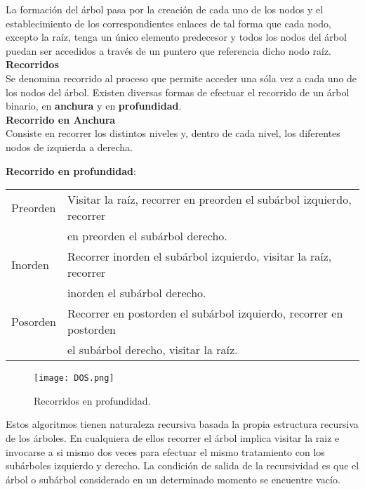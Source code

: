 \documentclass[12pt]{article}
\begin{document}
La formación del árbol pasa por la creación de cada uno de los nodos y el establecimiento de los correspondientes enlaces de tal forma que cada nodo, excepto la raíz, tenga un único elemento predecesor y todos los nodos del árbol puedan ser accedidos a través de un puntero que referencia dicho nodo raíz.\\

\textbf{Recorridos}\\

Se denomina recorrido al proceso que permite acceder una sóla vez a cada uno de los nodos del árbol. Existen diversas formas de efectuar el recorrido de un árbol binario, en \textbf{anchura} y en \textbf{profundidad}.\\

\textbf{Recorrido en Anchura}\\

Consiste en recorrer los distintos niveles y, dentro de cada nivel, los diferentes nodos de izquierda a derecha.\\

\pagebreak 

\textbf{Recorrido en profundidad}:
\begin{table}[h]
	\centering
	\begin{tabular}{l | l }
		\hline
Preorden & Visitar la raíz, recorrer en preorden el subárbol izquierdo, recorrer \\
	& en preorden el subárbol derecho.\\ \hline
Inorden & Recorrer inorden el subárbol izquierdo, visitar la raíz, recorrer \\ 
	& inorden el subárbol derecho. \\ \hline
Posorden & Recorrer en postorden el subárbol izquierdo, recorrer en postorden \\
         & el subárbol derecho, visitar la raíz. \\ \hline
	\end{tabular}
\end{table}

\begin{figure}[h]
\centering
   \texttt{[image: DOS.png]}
        \caption{Recorridos en profundidad.}
\end{figure}

Estos algoritmos tienen naturaleza recursiva basada la propia estructura recursiva de los árboles. En cualquiera de ellos recorrer el árbol implica visitar la raiz e invocarse a si mismo dos veces para efectuar el mismo tratamiento con los subárboles izquierdo y derecho. La condición de salida de la recursividad es que el árbol o subárbol considerado en un determinado momento se encuentre vacío. 
\end{document}
